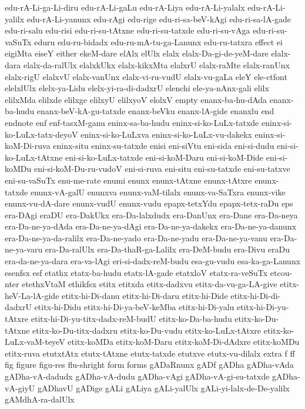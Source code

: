 {edu-rA-Li-ga-Li-diru
edu-rA-Li-gaLu
edu-rA-Liya
edu-rA-Li-yalalx
edu-rA-Li-yalilx
edu-rA-Li-yanunx
edu-rAgi
edu-rige
edu-ri-sa-beV-kAgi
edu-ri-sa-lA-gade
edu-ri-salu
edu-risi
edu-ri-su-tAtxne
edu-ri-su-tatxde
edu-ri-su-vAga
edu-ri-su-vaSuTx
eduru
edu-ru-bidadx
edu-ru-mA-tu-ga-Lanunx
edu-ru-tatxra
effect
ei
eigiMta
eiseY
either
ekeM-dare
elAlx
elUlx
elalx
elalx-Da-gi-de-yeM-dare
elalx-dara
elalx-da-ralUlx
elalxkUkx
elalx-kikxMta
elalxrU
elalx-raMte
elalx-ranUnx
elalx-rigU
elalxvU
elalx-vanUnx
elalx-vi-ru-vudU
elalx-vu-gaLa
eleY
ele-ctfont
elelxlUlx
elelx-ya-Lidu
elelx-yi-ra-di-dadxrU
elenchi
ele-ya-nAnx-gali
elilx
elilxMda
elilxde
elilxge
elilxyU
elilxyoV
elolxV
empty
enanx-ba-hu-dAda
enanx-ba-hudu
enanx-beV-kA-gu-tatxde
enanx-beVku
enanx-lA-gide
enanxlu
end
endnote
enf
enf-tasxM-ganu
eninx-sa-ba-hudu
eninx-si-ko-LuLx-tatxde
eninx-si-ko-LuLx-tatx-deyoV
eninx-si-ko-LuLxva
eninx-si-ko-LuLx-vu-dakekx
eninx-si-koM-Di-ruva
eninx-situ
eninx-su-tatxde
enisi
eni-siVtu
eni-sida
eni-si-dudu
eni-si-ko-LuLx-tAtxne
eni-si-ko-LuLx-tatxde
eni-si-koM-Daru
eni-si-koM-Dide
eni-si-koMDu
eni-si-koM-Du-ru-vudoV
eni-si-ruva
eni-situ
eni-su-tatxde
eni-su-tatxve
eni-su-vaSuTx
enu-me-rate
enumi
enunx
enunx-tAtxne
enunx-tAtxre
enunx-tatxde
enunx-vA-galU
enunxva
enunx-vaM-tilalx
enunx-va-SaTxra
enunx-vike
enunx-vu-dA-dare
enunx-vudU
enunx-vudu
epapx-tetxYdu
epapx-tetx-raDu
eps
era-DAgi
eraDU
era-DakUkx
era-Da-lalxdudx
era-DanUnx
era-Dane
era-Da-neya
era-Da-ne-ya-dAda
era-Da-ne-ya-dAgi
era-Da-ne-ya-dakekx
era-Da-ne-ya-danunx
era-Da-ne-ya-da-ralilx
era-Da-ne-yado
era-Da-ne-yadu
era-Da-ne-ya-vanu
era-Da-ne-ya-varu
era-Da-ralUlx
era-Da-thaR-ga-Lalilx
era-DeM-budu
era-Divu
eraDu
era-da-ne-ya-dara
era-va-lAgi
eri-si-dadx-reM-budu
esa-gu-vudu
esa-ka-ga-Lanunx
esenfsx
esf
etathx
etatx-ba-hudu
etatx-lA-gade
etatxloV
etatx-ra-veSuTx
etcou-nter
etethxVtaM
ethikfsx
etitx
etitxda
etitx-dadxvu
etitx-da-vu-ga-LA-give
etitx-heV-La-lA-gide
etitx-hi-Di-danu
etitx-hi-Di-daru
etitx-hi-Dide
etitx-hi-Di-di-dadxrU
etitx-hi-Didu
etitx-hi-Di-ya-beV-keMba
etitx-hi-Di-yalu
etitx-hi-Di-yu-tAtxre
etitx-hi-Di-yu-titx-dadx-reM-budU
etitx-ko-Da-ba-hudu
etitx-ko-Du-tAtxne
etitx-ko-Du-titx-dadxru
etitx-ko-Du-vudu
etitx-ko-LuLx-tAtxre
etitx-ko-LuLx-vaM-teyeV
etitx-koMDa
etitx-koM-Daru
etitx-koM-Di-dAdxre
etitx-koMDu
etitx-ruva
etutxtAtx
etutx-tAtxne
etutx-tatxde
etutxve
etutx-vu-dilalx
extra
f
ff
fig
figure
figu-res
flu-shright
form
forms
gADaRnunx
gADf
gADha
gADha-vAda
gADha-vA-dadudx
gADha-vA-dudu
gADha-vAgi
gADha-vA-gi-su-tatxde
gADha-vA-giyU
gADhavU
gADige
gALi
gALiya
gALi-yalUlx
gALi-yi-lalx-de-De-yalilx
gAMdhA-ra-dalUlx
}
